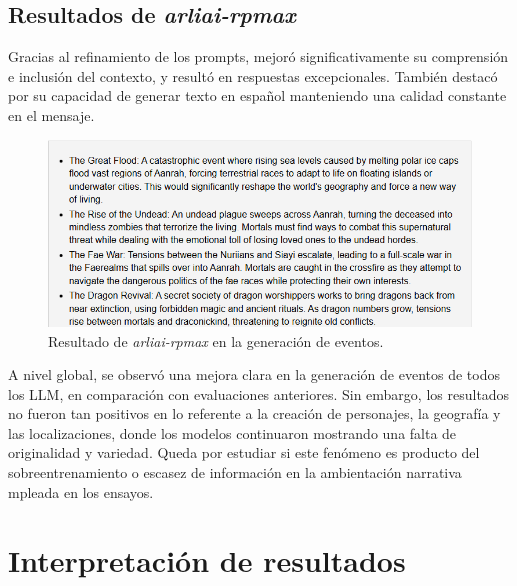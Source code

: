 \subsection{Resultados de \textit{arliai-rpmax}}
Gracias al refinamiento de los prompts,
mejoró significativamente su comprensión e inclusión del contexto,
y resultó en respuestas excepcionales.
También destacó por su capacidad de generar texto en español
manteniendo una calidad constante en el mensaje.

\begin{figure}[htbp]
	\centering
	\includegraphics[width=1\textwidth]{./Figures/rpmax-prompt-events.png}
	\caption{Resultado de \textit{arliai-rpmax} en la generación de eventos.}
	\label{fig:rpmax-events}
\end{figure}

A nivel global, se observó una mejora clara en la generación de eventos de todos los LLM,
en comparación con evaluaciones anteriores.
Sin embargo, los resultados no fueron tan positivos en lo referente a la creación de personajes,
la geografía y las localizaciones,
donde los modelos continuaron mostrando una falta de originalidad y variedad.
Queda por estudiar si este fenómeno es producto del sobreentrenamiento o escasez de información
en la ambientación narrativa mpleada en los ensayos.

\section{Interpretación de resultados}
